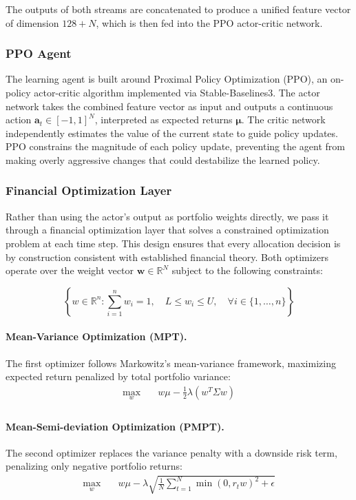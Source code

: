 \documentclass[final]{article}
\begin{document}
The outputs of both streams are concatenated to produce a unified feature vector of dimension $128 + N$, which is then
fed into the PPO actor-critic network.
\subsubsection*{PPO Agent}
The learning agent is built around Proximal Policy Optimization (PPO), an on-policy actor-critic algorithm implemented
via Stable-Baselines3. The actor network takes the combined feature vector as input and outputs a continuous action
$\mathbf{a}_t \in [-1, 1]^N$, interpreted as expected returns $\boldsymbol{\mu}$. The critic network independently
estimates the value of the current state to guide policy updates. PPO constrains the magnitude of each policy update,
preventing the agent from making overly aggressive changes that could destabilize the learned policy.
\subsubsection*{Financial Optimization Layer}
\label{sec:optimizers}
Rather than using the actor's output as portfolio weights directly, we pass it through a financial optimization layer
that solves a constrained optimization problem at each time step. This design ensures that every allocation decision is
by construction consistent with established financial theory. Both optimizers operate over the weight vector $\mathbf{w}
\in \mathbb{R}^N$ subject to the following constraints:

\begin{equation}
    \left\{ w \in \mathbb{R}^n : \sum_{i=1}^n w_i = 1, \quad L \leq w_i \leq U, \quad \forall i \in \{1, \dots, n\} \right\}
\end{equation}

\paragraph{Mean-Variance Optimization (MPT).}
The first optimizer follows Markowitz's mean-variance framework, maximizing expected return penalized by total
portfolio variance:
\begin{equation}
    \begin{aligned}
        \max_{w} \quad & w \mu - \frac{1}{2} \lambda (w^T \Sigma w) \\
    \end{aligned}
\end{equation}

\paragraph{Mean-Semi-deviation Optimization (PMPT).}
The second optimizer replaces the variance penalty with a downside risk term, penalizing only negative portfolio
returns:
\begin{equation}
    \begin{aligned}
        \max_{w} \quad & w \mu - \lambda \sqrt{\frac{1}{N} \sum_{t=1}^{N} \min(0, r_t w)^2 + \epsilon} \\
    \end{aligned}
\end{equation}
\end{document}
